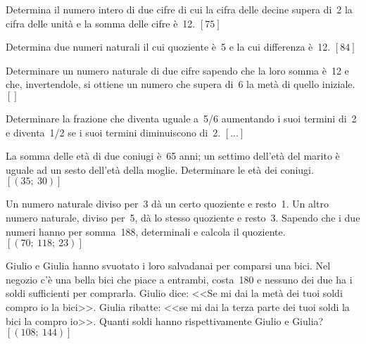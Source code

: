\begin{multicols}{2}
\begin{esercizio}[\Ast]
 \label{ese:22.84}
Determina il numero intero di due cifre di cui la cifra delle decine 
supera di~2 la cifra delle unità e la somma delle cifre è~12.
\hfill \(\left[75\right]\)
\end{esercizio}

\begin{esercizio}[\croce]
 \label{ese:22.85}
Determina due numeri naturali il cui quoziente è~5 e la cui differenza è~12.
\hfill \(\left[84\right]\)
\end{esercizio}

\begin{esercizio}[\Ast, \croce]
 \label{ese:22.86}
Determinare un numero naturale di due cifre sapendo che la loro somma
è~12 e che, invertendole, si ottiene un numero che supera di~6 la
metà di quello iniziale.
\hfill \(\left[\right]\)
\end{esercizio}

\begin{esercizio}[\croce]
 \label{ese:22.87}
Determinare la frazione che diventa uguale a~5/6 aumentando i suoi
termini di~2 e diventa~1/2 se i suoi termini diminuiscono di~2.
\hfill \(\left[...\right]\)
\end{esercizio}

\begin{esercizio}[\Ast, \croce]
 \label{ese:22.88}
La somma delle età di due coniugi è~65 anni; un settimo
dell'età del marito è uguale ad un sesto
dell'età della moglie. Determinare le età dei
coniugi.
\hfill \(\left[(35;~30)\right]\)
\end{esercizio}

\begin{esercizio}[\Ast, \croce]
 \label{ese:22.89}
Un numero naturale diviso per~3 dà un certo quoziente e resto~1. Un
altro numero naturale, diviso per~5, dà lo stesso quoziente e resto~3.
Sapendo che i due numeri hanno per somma~188, determinali e calcola
il quoziente.
\hfill \(\left[(70;~118;~23)\right]\)
\end{esercizio}

\begin{esercizio}[\Ast]
 \label{ese:22.90}
Giulio e Giulia hanno svuotato i loro
salvadanai per comparsi una bici. Nel negozio c'è
una bella bici che piace a entrambi, costa{\officialeuro}~180 e nessuno dei
due ha i soldi sufficienti per comprarla. Giulio dice:
<<Se mi dai la metà dei tuoi soldi compro io la
bici>>. Giulia ribatte: <<se mi dai la terza
parte dei tuoi soldi la bici la compro io>>. Quanti soldi
hanno rispettivamente Giulio e Giulia?
\hfill \(\left[(108;~144)\right]\)
\end{esercizio}


\end{multicols}
